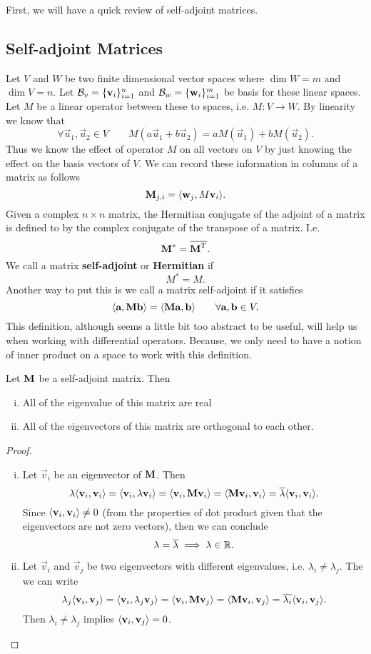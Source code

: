 First, we will have a quick review of self-adjoint matrices.
\subsection{Self-adjoint Matrices}
Let $V$ and $W$ be two finite dimensional vector spaces where $\dim W =m$ and $\dim V = n$. Let $\mathcal{B}_v=\{\textbf{v}_i\}_{i=1}^{n}$ and $\mathcal{B}_w = \{\textbf{w}_i\}_{i=1}^{m}$ be basis for these linear spaces. Let $M$ be a linear operator between these to spaces, i.e. $M: V \to W$. By linearity we know that
\[ \forall \vec{u}_1, \vec{u}_2 \in V \qquad M(a\vec{u}_1 + b\vec{u}_2) = aM(\vec{u}_1) + bM(\vec{u}_2). \]
Thus we know the effect of operator $M$ on all vectors on $V$ by just knowing the effect on the basis vectors of $V$. We can record these information in columns of a matrix as follows
\[  \textbf{M}_{j,i} = \langle \textbf{w}_j, M \textbf{v}_i \rangle.  \]
Given a complex $n\times n$ matrix, the Hermitian conjugate of the adjoint of a matrix is defined to by the complex conjugate of the transpose of a matrix. I.e.
\[ \textbf{M}^* = \overline{\textbf{M}^T}. \]
We call a matrix \textbf{self-adjoint} or \textbf{Hermitian} if 
\[ M^* = M. \]
Another way to put this is we call a matrix self-adjoint if it satisfies
\[ \langle \textbf{a}, \textbf{M}\textbf{b} \rangle = \langle \textbf{M}\textbf{a}, \textbf{b} \rangle \qquad \forall \textbf{a},\textbf{b} \in V. \]
This definition, although seems a little bit too abstract to be useful, will help us when working with differential operators. Because, we only need to have a notion of inner product on a space to work with this definition.
\begin{proposition}
	Let $\textbf{M}$ be a self-adjoint matrix. Then
	\begin{enumerate}[(i)]
		\item All of the eigenvalue of this matrix are real
		\item All of the eigenvectors of this matrix are orthogonal to each other.
	\end{enumerate}
\end{proposition}
\begin{proof}$\ $\\
	\begin{enumerate}[(i)]
		\item Let $\vec{v}_i$ be an eigenvector of $\textbf{M}$. Then
		\[ \lambda\langle \textbf{v}_i, \textbf{v}_i \rangle = \langle \textbf{v}_i, \lambda\textbf{v}_i \rangle = \langle \textbf{v}_i, \textbf{M}\textbf{v}_i \rangle = \langle \textbf{M}\textbf{v}_i, \textbf{v}_i \rangle = \overline{\lambda}\langle \textbf{v}_i, \textbf{v}_i \rangle. \]
		Since $\langle \textbf{v}_i, \textbf{v}_i \rangle \neq 0$ (from the properties of dot product given that the eigenvectors are not zero vectors), then we can conclude 
		\[ \lambda = \overline{\lambda} \implies \lambda \in \mathbb{R}. \]
		\item Let $\vec{v}_i$ and $\vec{v}_j$ be two eigenvectors with different eigenvalues, i.e. $\lambda_i \neq \lambda_j$. The we can write
		\[ \lambda_j\langle \textbf{v}_i, \textbf{v}_j \rangle=\langle \textbf{v}_i, \lambda_j\textbf{v}_j \rangle=\langle \textbf{v}_i, \textbf{M}\textbf{v}_j \rangle = \langle \textbf{M}\textbf{v}_i, \textbf{v}_j \rangle = \overline{\lambda_i}\langle \textbf{v}_i, \textbf{v}_j \rangle. \]
		Then $\lambda_i \neq \lambda_j$ implies $\langle \textbf{v}_i, \textbf{v}_j \rangle = 0$.
	\end{enumerate}
\end{proof}
